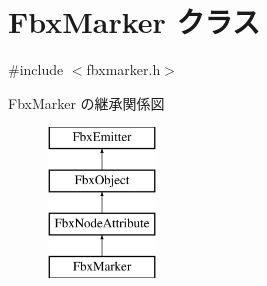\hypertarget{class_fbx_marker}{}\section{Fbx\+Marker クラス}
\label{class_fbx_marker}


{\ttfamily \#include $<$fbxmarker.\+h$>$}

Fbx\+Marker の継承関係図\begin{figure}[H]
\begin{center}
\leavevmode
\includegraphics[height=4.000000cm]{class_fbx_marker}
\end{center}
\end{figure}
